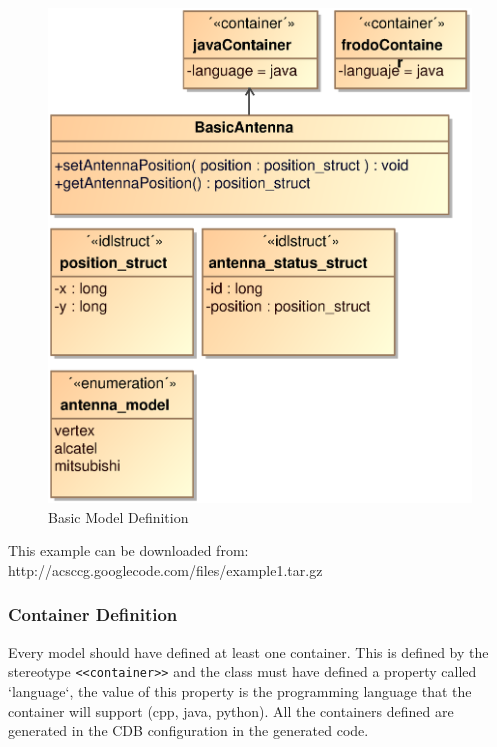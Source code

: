 \begin{figure}[h!t]
\begin{center}
\includegraphics[scale=0.36]{images/example1}
\caption{\label{fig:vs_diag}Basic Model Definition}
\end{center}
\end{figure} 

This example can be downloaded from:
http://acsccg.googlecode.com/files/example1.tar.gz

\subsubsection{Container Definition}
Every model should have defined at least one container. This is defined by the
stereotype  \verb+<<container>>+ and the class must have defined a property
called  `language`, the value of this property is the programming language that
the container will support (cpp, java, python).
All the containers defined are generated in the CDB configuration in the
generated code.


